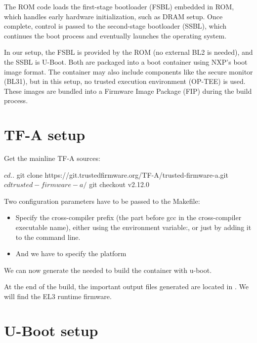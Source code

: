 The ROM code loads the first-stage bootloader (FSBL) embedded in ROM, which
handles early hardware initialization, such as DRAM setup. Once complete,
control is passed to the second-stage bootloader (SSBL), which continues the
boot process and eventually launches the operating system.

In our setup, the FSBL is provided by the ROM (no external BL2 is needed), and
the SSBL is U-Boot. Both are packaged into a boot container using NXP’s boot
image format. The container may also include components like the secure monitor
(BL31), but in this setup, no trusted execution environment (OP-TEE) is used.
These images are bundled into a Firmware Image Package (FIP) during the build
process.

\section{TF-A setup}

Get the mainline TF-A sources:

\begin{bashinput}
$ cd ..
$ git clone https://git.trustedfirmware.org/TF-A/trusted-firmware-a.git
$ cd trusted-firmware-a/
$ git checkout v2.12.0
\end{bashinput}

Two configuration parameters have to be passed to the Makefile:
\begin{itemize}
\item Specify the cross-compiler prefix (the part before gcc in the
      cross-compiler executable name), either using the environment
      variable:, or just by
      adding it to the  command line.

\item And we have to specify the platform 
\end{itemize}

We can now generate the  needed to build the container with u-boot.

At the end of the build, the important output files generated are
located in . We will find  the EL3 runtime firmware.

\section{U-Boot setup}


